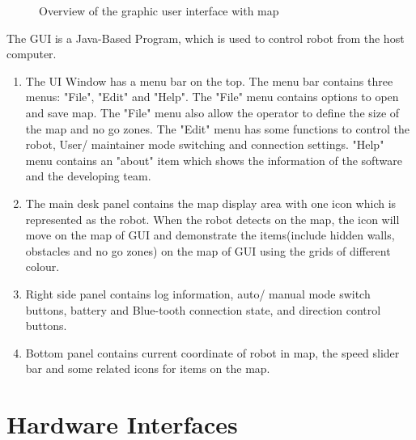 \documentclass[11pt, a4paper]{report}
\begin{document}
\begin{figure}[ht]
\centering
\setlength\fboxsep{2pt}
\setlength\fboxrule{0.2pt}
\caption{Overview of the graphic user interface with map}
\label{sec:GUI}
\label{fig:GUI}
\end{figure}
\pagebreak
The GUI is a Java-Based Program, which is used to control robot from the host computer. 
\begin{enumerate}
\item The UI Window has a menu bar on the top. The menu bar contains three menus: "File", "Edit" and "Help". The "File" menu contains options to open and save map. The "File" menu also allow the operator to define the size of the map and no go zones. The "Edit" menu has some functions to control the robot, User/ maintainer mode switching and connection settings. "Help" menu contains an "about" item which shows the information of the software and the developing team. 
\item The main desk panel contains the map display area with one icon which is represented as the robot. When the robot detects on the map, the icon will move on the map of GUI and demonstrate the items(include hidden walls, obstacles and no go zones) on the map of GUI using the grids of different colour.
\item Right side panel contains log information, auto/ manual mode switch buttons, battery and Blue-tooth connection state, and direction control buttons. 
\item Bottom panel contains current coordinate of robot in map, the speed slider bar and some related icons for items on the map. 
\end{enumerate}

\pagebreak

\section{Hardware Interfaces}
\end{document}

